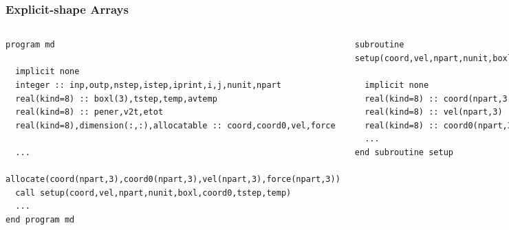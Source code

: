\documentclass[slidestop,mathserif,compress,xcolor=svgnames]{beamer}
\newenvironment{eblock}[0]
{
\begin{beamerboxesrounded}[upper=uppercol2,lower=lowercol2,shadow=true]}
{\end{beamerboxesrounded}}
\begin{document}
\begin{frame}[fragile]
  \frametitle{\small Explicit-shape Arrays}
  {\fontsize{4}{5}
    \begin{columns}
    \column{6cm}
    \begin{eblock}{}
      \begin{verbatim}
program md

  implicit none
  integer :: inp,outp,nstep,istep,iprint,i,j,nunit,npart
  real(kind=8) :: boxl(3),tstep,temp,avtemp
  real(kind=8) :: pener,v2t,etot
  real(kind=8),dimension(:,:),allocatable :: coord,coord0,vel,force
  
  ...
  allocate(coord(npart,3),coord0(npart,3),vel(npart,3),force(npart,3))
  call setup(coord,vel,npart,nunit,boxl,coord0,tstep,temp)   
  ...
end program md
      \end{verbatim}
    \end{eblock}
    \column{5.5cm}
    \begin{eblock}{}
      \begin{verbatim}
subroutine setup(coord,vel,npart,nunit,boxl,coord0,tstep,temp)

  implicit none
  real(kind=8) :: coord(npart,3)
  real(kind=8) :: vel(npart,3)
  real(kind=8) :: coord0(npart,3)
  ...
end subroutine setup
      \end{verbatim}
    \end{eblock}
    \end{columns}
  }
\end{frame}
\end{document}

